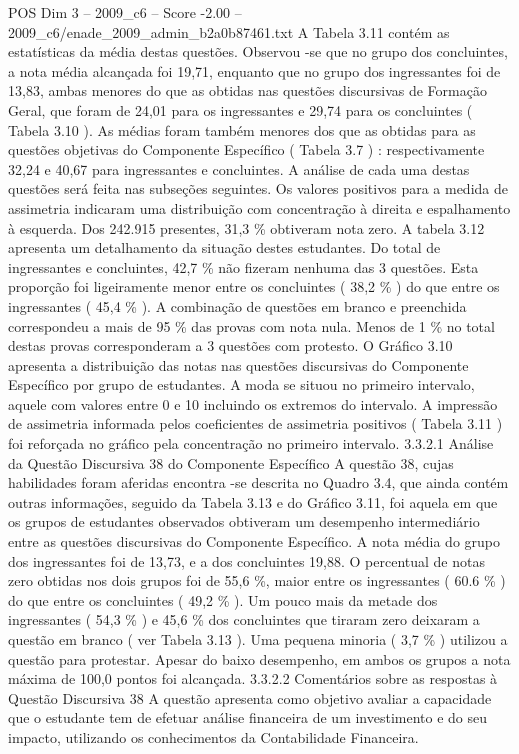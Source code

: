 \begin{textsample}{POS Dim 3 – 2009\_c6 – Score -2.00 – 2009\_c6/enade\_2009\_admin\_b2a0b87461.txt}
A Tabela 3.11 contém as estatísticas da média destas questões.
Observou -se que no grupo dos concluintes, a nota média alcançada foi 19,71, enquanto que no grupo dos ingressantes foi de 13,83, ambas menores do que as obtidas nas questões discursivas de Formação Geral, que foram de 24,01 para os ingressantes e 29,74 para os concluintes ( Tabela 3.10 ).
As médias foram também menores dos que as obtidas para as questões objetivas do Componente Específico ( Tabela 3.7 ) : respectivamente 32,24 e 40,67 para ingressantes e concluintes.
A análise de cada uma destas questões será feita nas subseções seguintes.
Os valores positivos para a medida de assimetria indicaram uma distribuição com concentração à direita e espalhamento à esquerda.
Dos 242.915 presentes, 31,3 \% obtiveram nota zero.
A tabela 3.12 apresenta um detalhamento da situação destes estudantes.
Do total de ingressantes e concluintes, 42,7 \% não fizeram nenhuma das 3 questões.
Esta proporção foi ligeiramente menor entre os concluintes ( 38,2 \% ) do que entre os ingressantes ( 45,4 \% ).
A combinação de questões em branco e preenchida correspondeu a mais de 95 \% das provas com nota nula.
Menos de 1 \% no total destas provas corresponderam a 3 questões com protesto.
O Gráfico 3.10 apresenta a distribuição das notas nas questões discursivas do Componente Específico por grupo de estudantes.
A moda se situou no primeiro intervalo, aquele com valores entre 0 e 10 incluindo os extremos do intervalo.
A impressão de assimetria informada pelos coeficientes de assimetria positivos ( Tabela 3.11 ) foi reforçada no gráfico pela concentração no primeiro intervalo. 3.3.2.1 Análise da Questão Discursiva 38 do Componente Específico A questão 38, cujas habilidades foram aferidas encontra -se descrita no Quadro 3.4, que ainda contém outras informações, seguido da Tabela 3.13 e do Gráfico 3.11, foi aquela em que os grupos de estudantes observados obtiveram um desempenho intermediário entre as questões discursivas do Componente Específico.
A nota média do grupo dos ingressantes foi de 13,73, e a dos concluintes 19,88.
O percentual de notas zero obtidas nos dois grupos foi de 55,6 \%, maior entre os ingressantes ( 60.6 \% ) do que entre os concluintes ( 49,2 \% ).
Um pouco mais da metade dos ingressantes ( 54,3 \% ) e 45,6 \% dos concluintes que tiraram zero deixaram a questão em branco ( ver Tabela 3.13 ).
Uma pequena minoria ( 3,7 \% ) utilizou a questão para protestar.
Apesar do baixo desempenho, em ambos os grupos a nota máxima de 100,0 pontos foi alcançada. 3.3.2.2 Comentários sobre as respostas à Questão Discursiva 38 A questão apresenta como objetivo avaliar a capacidade que o estudante tem de efetuar análise financeira de um investimento e do seu impacto, utilizando os conhecimentos da Contabilidade Financeira.

\end{textsample}
